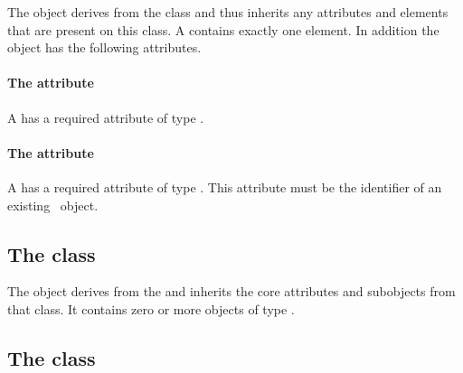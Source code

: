 


The \Domain object derives from the \SBase class and thus inherits any
attributes and elements that are present on this class.
A \Domain contains exactly one \ListOfInteriorPoints element.
In addition the \Domain object has the following attributes.

\paragraph{The \fixttspace{} attribute}

A \Domain has a required attribute  of type .


\paragraph{The \fixttspace{} attribute}

A \Domain has a required attribute  of type
.
This attribute must be the identifier of an existing \ object.


\subsection{The  class}
\label{listofinteriorpoints-class}


The \ListOfInteriorPoints object derives from the  and
inherits the core attributes and subobjects from that class. It contains
zero or more objects of type \InteriorPoint.

\subsection{The  class}
\label{interiorpoint-class}

